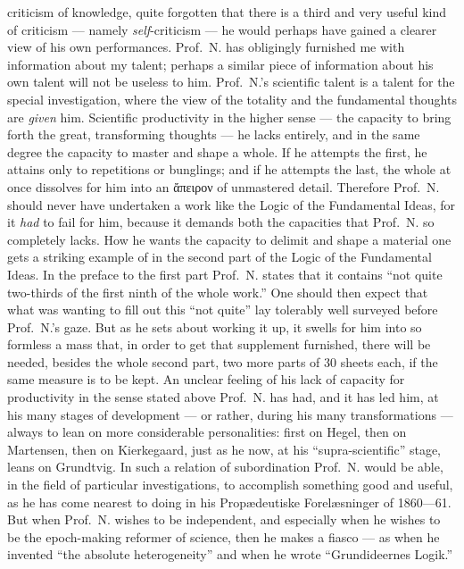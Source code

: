 \documentclass[12pt,a4paper]{book}
\begin{document}
criticism of knowledge, quite forgotten that there is a third and very useful kind
of criticism --- namely \emph{self}-criticism --- he would perhaps have gained a
clearer view of his own
performances. Prof.\ N. has obligingly furnished me with information about my
talent; perhaps a similar piece of information about his own talent will not be
useless to him. Prof.\ N.'s scientific talent is a talent for the special
investigation, where the view of the totality and the fundamental thoughts are
\emph{given} him. Scientific productivity in the higher sense --- the capacity to
bring forth the great, transforming thoughts --- he lacks entirely, and in the
same degree the capacity to master and shape a whole. If he attempts the first,
he attains only to repetitions or bunglings; and if he attempts the last, the
whole at once dissolves for him into an ἄπειρον of unmastered detail. Therefore
Prof.\ N. should never have
undertaken a work like the Logic of the Fundamental Ideas, for it \emph{had} to
fail for him, because it demands both the capacities that Prof.\ N. so completely
lacks. How he wants the capacity to delimit and shape a material one gets a
striking example of in the second part of the Logic of the Fundamental Ideas. In
the preface to the first part Prof.\ N. states that it contains ``not quite
two-thirds of the first ninth of the whole work.'' One should then expect that
what was wanting to fill out this ``not quite'' lay tolerably well surveyed
before Prof.\ N.'s gaze. But as he sets about working it up, it swells for him
into so formless a mass that, in order to get that supplement furnished, there
will be needed, besides the whole second part, two more parts of 30 sheets each,
if the same measure is to be kept. An unclear feeling of his lack of capacity
for productivity in the sense stated above Prof.\ N. has had, and it has led him,
at his many stages of development --- or rather, during his many
transformations --- always to lean on more considerable personalities: first on
Hegel, then on Martensen, then on Kierkegaard, just as he now, at his
``supra-scientific'' stage, leans on Grundtvig. In such a relation of
subordination Prof.\ N. would be able, in the field of particular
investigations, to accomplish something good and useful, as he has come nearest
to doing in his Propædeutiske Forelæsninger of 1860---61. But when Prof.\ N.
wishes to be independent, and especially when he wishes to be the epoch-making
reformer of science, then he makes a fiasco --- as when he invented ``the
absolute heterogeneity'' and when he wrote ``Grundideernes Logik.''
\end{document}
